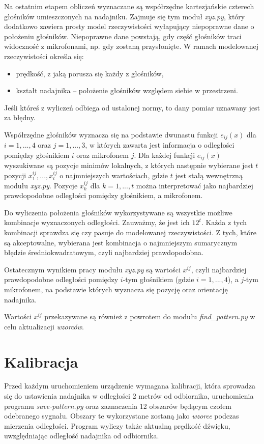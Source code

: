 Na ostatnim etapem obliczeń wyznaczane są współrzędne kartezjańskie czterech głośników umieszczonych na nadajniku.
Zajmuje się tym moduł \textit{xyz.py}, który dodatkowo zawiera prosty model rzeczywistości
wyłapujący niepoprawne dane o położeniu głośników.
Niepoprawne dane powstają, gdy część głośników traci widoczność z mikrofonami, np. gdy zostaną przysłonięte.
W ramach modelowanej rzeczywistości określa się:
\begin{itemize}
  \item prędkość, z jaką porusza się każdy z głośników,
  \item kształt nadajnika -- położenie głośników względem siebie w przestrzeni.
\end{itemize}
Jeśli któreś z wyliczeń odbiega od ustalonej normy, to dany pomiar uznawany jest za błędny.


Współrzędne głośników wyznacza się na podstawie dwunastu funkcji $e_{ij}(x)$ dla $i=1, ..., 4$ oraz $j=1, ..., 3$,
w których zawarta jest informacja o odległości pomiędzy głośnikiem $i$ oraz mikrofonem $j$.
Dla każdej funkcji $e_{ij}(x)$ wyszukiwane są pozycje minimów lokalnych, 
z których następnie wybierane jest $t$ pozycji $x^{ij}_1, ..., x^{ij}_t$
o najmniejszych wartościach, gdzie $t$ jest stałą wewnętrzną modułu \textit{xyz.py}.
Pozycje $x^{ij}_k$ dla $k=1, ..., t$  można interpretować jako najbardziej prawdopodobne odległości pomiędzy głośnikiem, a mikrofonem.

Do wyliczenia położenia głośników wykorzystywane są wszystkie możliwe kombinacje wyznaczonych odległości.
Zauważmy, że jest ich $12^t$. Każda z tych kombinacji 
sprawdza się czy pasuje do modelowanej rzeczywistości. Z tych, które są akceptowalne, wybierana jest 
kombinacja o najmniejszym sumarycznym błędzie średniokwadratowym, czyli najbardziej prawdopodobna.

Ostatecznym wynikiem pracy modułu \textit{xyz.py} są wartości $x^{ij}$, czyli najbardziej prawdopodobne odległości
pomiędzy  $i$-tym głośnikiem (gdzie $i=1,...,4$), a $j$-tym mikrofonem, na podstawie których 
wyznacza się  pozycję oraz orientację nadajnika.

Wartości $x^{ij}$ przekazywane są również z powrotem do modułu \textit{find\_pattern.py} w celu aktualizacji \textit{wzorców}.


\section{Kalibracja}

Przed każdym uruchomieniem urządzenie wymagana kalibracji,
która sprowadza się do ustawienia nadajnika w odległości 2 metrów od odbiornika,
uruchomienia programu \textit{save-pattern.py} oraz zaznaczenia  12 obszarów  będącym czołem odebranego sygnału.
Obszary te wykorzystane zostaną jako \textit{wzorce} podczas mierzenia odległości.
Program wyliczy także aktualną prędkość dźwięku, uwzględniając odległość nadajnika od odbiornika.

